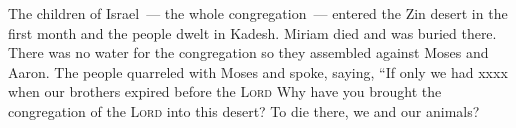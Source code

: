 
\begin{inparaenum}
     The children of Israel~--- the whole congregation~--- entered the Zin desert in the first month and the people dwelt in Kadesh. Miriam died and was buried there.%
     There was no water for the congregation so they assembled against Moses and Aaron.%
     The people quarreled with Moses and spoke, saying, ``If only we had xxxx when our brothers expired before the \textsc{Lord}%
     Why have you brought the congregation of the \textsc{Lord} into this desert? To die there, we and our animals?%
    
    
    
    
\end{inparaenum}
